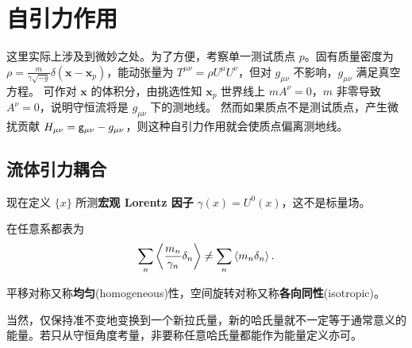 \chapter{自引力作用}
这里实际上涉及到微妙之处。为了方便，考察单一测试质点 $p$。固有质量密度为 $\rho=\frac{m}{\gamma\sqrt{-g}}\delta(\bm x-\bm x_p)$，能动张量为 $T^{\mu\nu}=\rho U^\mu U^\nu$，但对 $g_{\mu\nu}$ 不影响，$g_{\mu\nu}$ 满足真空方程。
可作对 $\bm x$ 的体积分，由挑选性知 $\bm x_p$ 世界线上 $m A^\nu=0$，$m$ 非零导致 $A^\nu=0$，说明守恒流将是 $g_{\mu\nu}$ 下的测地线。
然而如果质点不是测试质点，产生微扰贡献 $H_{\mu\nu}=\mathsf{g}_{\mu\nu}- g_{\mu\nu}$，则这种自引力作用就会使质点偏离测地线。

\section{流体引力耦合}

现在定义 $\{x\}$ 所测\textbf{宏观 Lorentz 因子} $\gamma(x) = U^0(x)$，这不是标量场。

在任意系都表为
\[
    \sum_n\ev{\frac{m_n}{\gamma_n}\delta_n} \ne \sum_n\ev{m_n\delta_n}.
\]

平移对称又称\textbf{均匀}(homogeneous)性，空间旋转对称又称\textbf{各向同性}(isotropic)。

当然，仅保持准不变地变换到一个新拉氏量，新的哈氏量就不一定等于通常意义的能量。若只从守恒角度考量，非要称任意哈氏量都能作为能量定义亦可。

